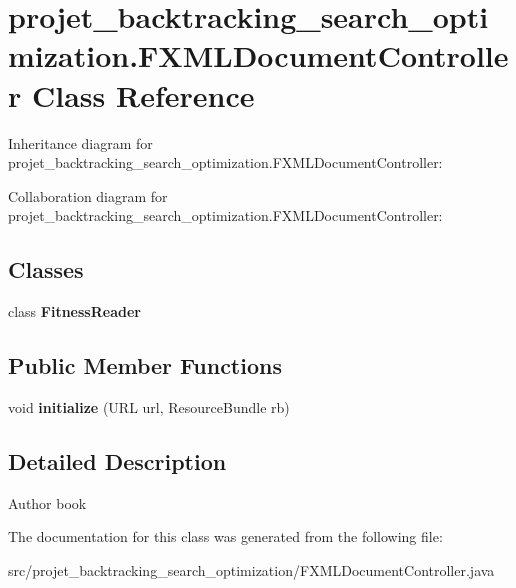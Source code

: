 \hypertarget{classprojet__backtracking__search__optimization_1_1_f_x_m_l_document_controller}{}\section{projet\+\_\+backtracking\+\_\+search\+\_\+optimization.\+F\+X\+M\+L\+Document\+Controller Class Reference}
\label{classprojet__backtracking__search__optimization_1_1_f_x_m_l_document_controller}


Inheritance diagram for projet\+\_\+backtracking\+\_\+search\+\_\+optimization.\+F\+X\+M\+L\+Document\+Controller\+:


Collaboration diagram for projet\+\_\+backtracking\+\_\+search\+\_\+optimization.\+F\+X\+M\+L\+Document\+Controller\+:
\subsection*{Classes}
\begin{DoxyCompactItemize}
\item 
class {\bfseries Fitness\+Reader}
\end{DoxyCompactItemize}
\subsection*{Public Member Functions}
\begin{DoxyCompactItemize}
\item 
\mbox{\label{classprojet__backtracking__search__optimization_1_1_f_x_m_l_document_controller_ac4589ff3482b3bde212f925ce616b0d7}} 
void {\bfseries initialize} (U\+RL url, Resource\+Bundle rb)
\end{DoxyCompactItemize}


\subsection{Detailed Description}
\begin{DoxyAuthor}{Author}
book 
\end{DoxyAuthor}


The documentation for this class was generated from the following file\+:\begin{DoxyCompactItemize}
\item 
src/projet\+\_\+backtracking\+\_\+search\+\_\+optimization/F\+X\+M\+L\+Document\+Controller.\+java\end{DoxyCompactItemize}
